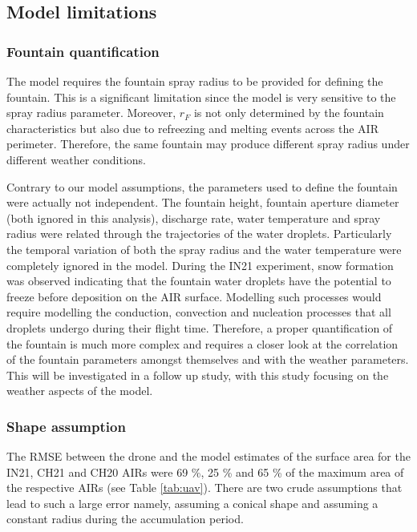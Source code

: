 \documentclass[utf8]{frontiersSCNS}
\begin{document}
\subsection{Model limitations}
\subsubsection{Fountain quantification}

The model requires the fountain spray radius to be provided for defining the fountain. This is a significant
limitation since the model is very sensitive to the spray radius parameter. Moreover, $r_F$ is not only
determined by the fountain characteristics but also due to refreezing and melting events across the AIR
perimeter. Therefore, the same fountain may produce different spray radius under different weather conditions.

Contrary to our model assumptions, the parameters used to define the fountain were actually not independent. The
fountain height, fountain aperture diameter (both ignored in this analysis), discharge rate, water temperature
and spray radius were related through the trajectories of the water droplets. Particularly the temporal
variation of both the spray radius and the water temperature were completely ignored in the model. During the
IN21 experiment, snow formation was observed indicating that the fountain water droplets have the potential to
freeze before deposition on the AIR surface. Modelling such processes would require modelling the conduction,
convection and nucleation processes that all droplets undergo during their flight time. Therefore, a proper
quantification of the fountain is much more complex and requires a closer look at the correlation of the
fountain parameters amongst themselves and with the weather parameters. This will be investigated in a follow up
study, with this study focusing on the weather aspects of the model.

\subsubsection{Shape assumption}

The RMSE between the drone and the model estimates of the surface area for the IN21, CH21 and CH20 AIRs were 69
\%, 25 \% and 65 \% of the maximum area of the respective AIRs (see Table \ref{tab:uav}). There are two crude
assumptions that lead to such a large error namely, assuming a conical shape and assuming a constant radius
during the accumulation period.
\end{document}
